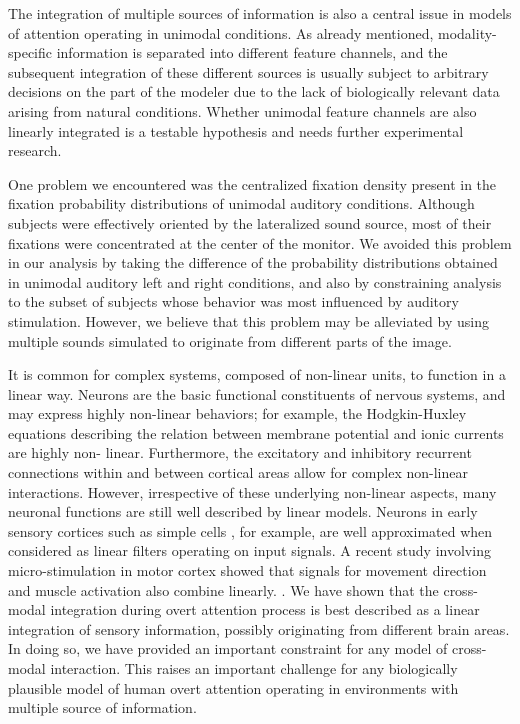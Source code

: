 The integration of multiple sources of information is also a central issue
in models of attention operating in unimodal conditions. As already
mentioned, modality-specific information is separated into different
feature channels, and the subsequent integration of these different sources
is usually subject to arbitrary decisions on the part of the modeler due to
the lack of biologically relevant data arising from natural conditions.
Whether unimodal feature channels are also linearly integrated is a
testable hypothesis and needs further experimental research. 

One problem we encountered was the centralized fixation density present in
the fixation probability distributions of unimodal auditory conditions.
Although subjects were effectively oriented by the lateralized sound
source, most of their fixations were concentrated at the center of the
monitor. We avoided this problem in our analysis by taking the difference
of the probability distributions obtained in unimodal auditory left and
right conditions, and also by constraining analysis to the subset of
subjects whose behavior was most influenced by auditory stimulation.
However, we believe that this problem may be alleviated by using multiple
sounds simulated to originate from different parts of the image. 

It is common for complex systems, composed of non-linear units, to function
in a linear way. Neurons are the basic functional constituents of nervous
systems, and may express highly non-linear behaviors; for example, the
Hodgkin-Huxley equations describing the relation between membrane potential
and ionic currents are highly non- linear. Furthermore, the excitatory and
inhibitory recurrent connections within and between cortical areas allow
for complex non-linear interactions. However, irrespective of these
underlying non-linear aspects, many neuronal functions are still well
described by linear models. Neurons in early sensory cortices
\citep{schnupp2001a} such as simple cells \citep{Carandini1997b}, for
example, are well approximated when considered as linear filters operating
on input signals. A recent study involving micro-stimulation in motor
cortex showed that signals for movement direction and muscle activation
also combine linearly. \citep{ethier2006a}. We have shown that the
cross-modal integration during overt attention process is best described as
a linear integration of sensory information, possibly originating from
different brain areas. In doing so, we have provided an important
constraint for any model of cross-modal interaction. This raises an
important challenge for any biologically plausible model of human overt
attention operating in environments with multiple source of information. 

